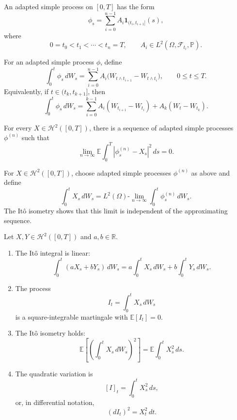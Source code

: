 \begin{de}
An adapted simple process on $[0,T]$ has the form
\[
\phi_s
=
\sum_{i=0}^{n-1}
A_i\mathbf{1}_{(t_i,t_{i+1}]}(s),
\]
where
\[
0=t_0<t_1<\cdots<t_n=T,
\qquad
A_i\in L^2(\Omega,\mathcal{F}_{t_i},\mathbb{P}).
\]
\end{de}

\begin{de}
For an adapted simple process $\phi$, define
\[
\int_0^t \phi_s\,dW_s
=
\sum_{i=0}^{n-1}
A_i\bigl(W_{t\wedge t_{i+1}}-W_{t\wedge t_i}\bigr),
\qquad 0\leq t\leq T.
\]
Equivalently, if $t\in(t_k,t_{k+1}]$, then
\[
\int_0^t \phi_s\,dW_s
=
\sum_{i=0}^{k-1}A_i(W_{t_{i+1}}-W_{t_i})
+A_k(W_t-W_{t_k}).
\]
\end{de}

\begin{thm}
For every $X\in\mathcal{H}^2([0,T])$, there is a sequence of adapted simple processes $\phi^{(n)}$ such that
\[
\lim_{n\to\infty}
\mathbb{E}\int_0^T
|\phi_s^{(n)}-X_s|^2\,ds
=0.
\]
\end{thm}

\begin{de}
For $X\in\mathcal{H}^2([0,T])$, choose adapted simple processes $\phi^{(n)}$ as above and define
\[
\int_0^t X_s\,dW_s
=
L^2(\Omega)\text{-}\lim_{n\to\infty}
\int_0^t\phi_s^{(n)}\,dW_s.
\]
The It\^o isometry shows that this limit is independent of the approximating sequence.
\end{de}

\begin{thm}
Let $X,Y\in\mathcal{H}^2([0,T])$ and $a,b\in\mathbb{R}$.
\begin{enumerate}
    \item The It\^o integral is linear:
    \[
    \int_0^t(aX_s+bY_s)\,dW_s
    =
    a\int_0^tX_s\,dW_s
    +b\int_0^tY_s\,dW_s.
    \]
    \item The process
    \[
    I_t=\int_0^tX_s\,dW_s
    \]
    is a square-integrable martingale with $\mathbb{E}[I_t]=0$.
    \item The It\^o isometry holds:
    \[
    \mathbb{E}\left[
    \left(\int_0^tX_s\,dW_s\right)^2
    \right]
    =
    \mathbb{E}\int_0^tX_s^2\,ds.
    \]
    \item The quadratic variation is
    \[
    [I]_t=\int_0^tX_s^2\,ds,
    \]
    or, in differential notation,
    \[
    (dI_t)^2=X_t^2\,dt.
    \]
\end{enumerate}
\end{thm}


